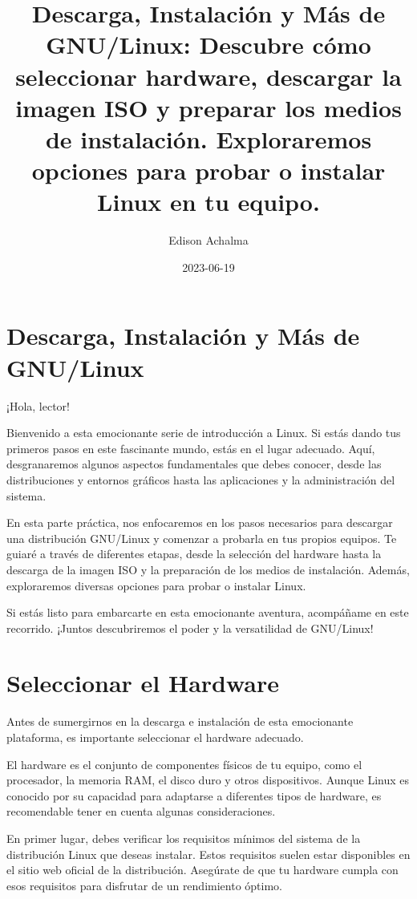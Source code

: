 \documentclass[
  jou,
  floatsintext,
  longtable,
  a4paper,
  nolmodern,
  notxfonts,
  notimes,
  colorlinks=true,linkcolor=blue,citecolor=blue,urlcolor=blue]{apa7}
\title{Descarga, Instalación y Más de GNU/Linux: Descubre cómo
seleccionar hardware, descargar la imagen ISO y preparar los medios de
instalación. Exploraremos opciones para probar o instalar Linux en tu
equipo.}
\author{Edison Achalma}
\affiliation{
{Escuela Profesional de Economía, Universidad Nacional de San Cristóbal
de Huamanga}}
\date{2023-06-19}
\begin{document}
\maketitle

\hypertarget{toc}{}
\tableofcontents
\newpage
\section[Introduction]{Descarga, Instalación y Más de GNU/Linux}

\setcounter{secnumdepth}{5}

\setlength\LTleft{0pt}


¡Hola, lector!

Bienvenido a esta emocionante serie de introducción a Linux. Si estás
dando tus primeros pasos en este fascinante mundo, estás en el lugar
adecuado. Aquí, desgranaremos algunos aspectos fundamentales que debes
conocer, desde las distribuciones y entornos gráficos hasta las
aplicaciones y la administración del sistema.

En esta parte práctica, nos enfocaremos en los pasos necesarios para
descargar una distribución GNU/Linux y comenzar a probarla en tus
propios equipos. Te guiaré a través de diferentes etapas, desde la
selección del hardware hasta la descarga de la imagen ISO y la
preparación de los medios de instalación. Además, exploraremos diversas
opciones para probar o instalar Linux.

Si estás listo para embarcarte en esta emocionante aventura, acompáñame
en este recorrido. ¡Juntos descubriremos el poder y la versatilidad de
GNU/Linux!

\section{Seleccionar el Hardware}\label{seleccionar-el-hardware}

Antes de sumergirnos en la descarga e instalación de esta emocionante
plataforma, es importante seleccionar el hardware adecuado.

El hardware es el conjunto de componentes físicos de tu equipo, como el
procesador, la memoria RAM, el disco duro y otros dispositivos. Aunque
Linux es conocido por su capacidad para adaptarse a diferentes tipos de
hardware, es recomendable tener en cuenta algunas consideraciones.

En primer lugar, debes verificar los requisitos mínimos del sistema de
la distribución Linux que deseas instalar. Estos requisitos suelen estar
disponibles en el sitio web oficial de la distribución. Asegúrate de que
tu hardware cumpla con esos requisitos para disfrutar de un rendimiento
óptimo.
\end{document}
